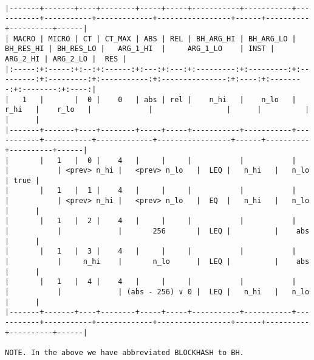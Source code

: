 \documentclass[varwidth=\maxdimen,margin=0.5cm,multi={verbatim}]{standalone}
\begin{document}
\begin{verbatim}

|-------+-------+----+--------+-----+-----+-----------+-----------+-----------+-----------+-------------+-----------------+------+----------+----------+------|
| MACRO | MICRO | CT | CT_MAX | ABS | REL | BH_ARG_HI | BH_ARG_LO | BH_RES_HI | BH_RES_LO |   ARG_1_HI  |     ARG_1_LO    | INST | ARG_2_HI | ARG_2_LO |  RES |
|:-----:+:-----:+:--:+:------:+:---:+:---:+:---------:+:---------:+:---------:+:---------:+:-----------:+:---------------:+:----:+:--------:+:--------:+:----:|
|   1   |       |  0 |    0   | abs | rel |    n_hi   |    n_lo   |    r_hi   |    r_lo   |             |                 |      |          |          |      |
|-------+-------+----+--------+-----+-----+-----------+-----------+-----------+-----------+-------------+-----------------+------+----------+----------+------|
|       |   1   |  0 |    4   |     |     |           |           |           |           | <prev> n_hi |   <prev> n_lo   |  LEQ |   n_hi   |   n_lo   | true |
|       |   1   |  1 |    4   |     |     |           |           |           |           | <prev> n_hi |   <prev> n_lo   |  EQ  |   n_hi   |   n_lo   |      |
|       |   1   |  2 |    4   |     |     |           |           |           |           |             |       256       |  LEQ |          |    abs   |      |
|       |   1   |  3 |    4   |     |     |           |           |           |           |     n_hi    |       n_lo      |  LEQ |          |    abs   |      |
|       |   1   |  4 |    4   |     |     |           |           |           |           |             | (abs - 256) ∨ 0 |  LEQ |   n_hi   |   n_lo   |      |
|-------+-------+----+--------+-----+-----+-----------+-----------+-----------+-----------+-------------+-----------------+------+----------+----------+------|

NOTE. In the above we have abbreviated BLOCKHASH to BH.
\end{verbatim}
\end{document}
